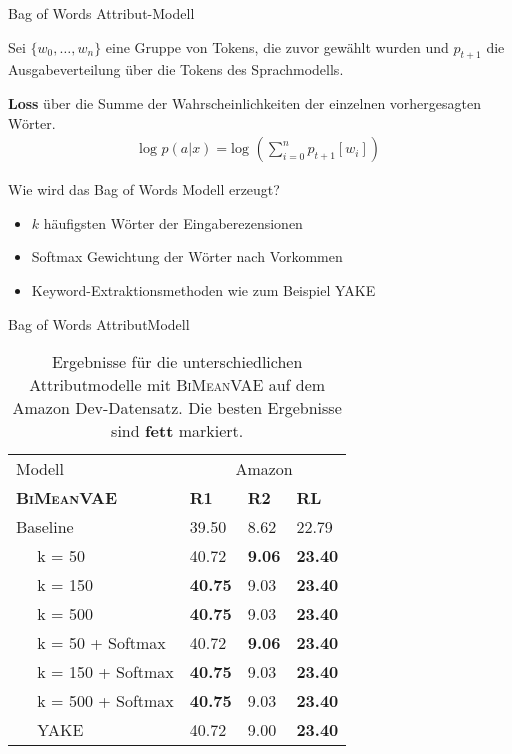 \begin{frame}{Bag of Words Attribut-Modell}
  
  Sei $\{w_0, \ldots, w_n\}$ eine Gruppe von Tokens, die zuvor gewählt wurden und $p_{t+1}$ die Ausgabeverteilung über die Tokens des Sprachmodells.

  \textbf{Loss} über die Summe der Wahrscheinlichkeiten der einzelnen vorhergesagten Wörter.
  \begin{align*}
      \text{log }p(a|x) = \text{log }(\sum_{i=0}^n p_{t+1}[w_i])
  \end{align*}

  \begin{block}{Wie wird das Bag of Words Modell erzeugt?}
    \begin{itemize}
\item $k$ häufigsten Wörter der Eingaberezensionen
\item Softmax Gewichtung der Wörter nach Vorkommen
\item Keyword-Extraktionsmethoden wie zum Beispiel YAKE
    \end{itemize}
    
  \end{block}
  
\end{frame}

\begin{frame}{Bag of Words AttributModell}
\begin{table}[h!]
  \centering
  \begin{tabular}{@{}llll@{}}
  \toprule
                  Modell   & \multicolumn{3}{c}{Amazon}              \\ 
  \textbf{\textsc{BiMeanVAE} }    & \textbf{R1} & \textbf{R2} & \textbf{RL} \\ \midrule
  Baseline        & 39.50       & 8.62    &  22.79     \\
  $\quad$ k = 50       &  40.72    &   \textbf{9.06}    &   \textbf{23.40}   \\
  $\quad$ k = 150  &  \textbf{40.75}   &    9.03  &  \textbf{23.40}   \\
  $\quad$ k = 500 &  \textbf{40.75}   &    9.03  &  \textbf{23.40}   \\
  $\quad$ k = 50 + Softmax    &  40.72    &   \textbf{9.06}    &    \textbf{23.40}   \\
  $\quad$ k = 150 + Softmax  &  \textbf{40.75}   &    9.03  &  \textbf{23.40}   \\
  $\quad$ k = 500 + Softmax   &  \textbf{40.75}   &    9.03  &  \textbf{23.40}   \\
  $\quad$ YAKE &  40.72   &     9.00  &  \textbf{23.40}   \\ \bottomrule
  \end{tabular}
  \caption{Ergebnisse für die unterschiedlichen Attributmodelle mit \textsc{BiMeanVAE} auf dem Amazon Dev-Datensatz. Die besten Ergebnisse sind \textbf{fett} markiert.}
\end{table}

\end{frame}


